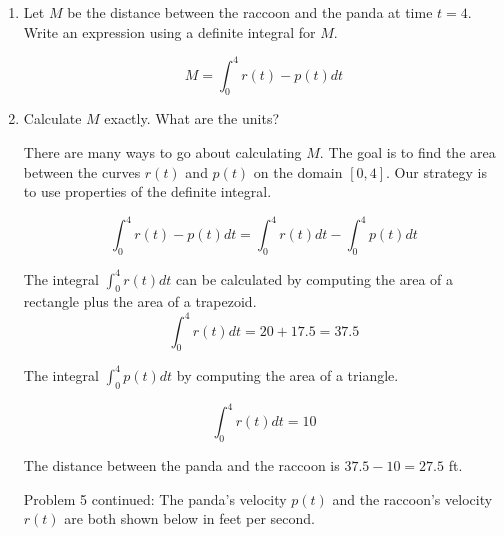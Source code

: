\documentclass{article}
\begin{document}
\begin{enumerate}
\begin{enumerate}
   

  \item  Let $M$ be the distance between the raccoon and the panda at
      time $t=4$.  Write an expression using a definite integral for $M$. 
      
      \probonly{\vfill}
   
\begin{solution}
  
     $$M = \int_{0}^4 r(t) - p(t)dt$$ 

  \end{solution}

  \item Calculate $M$ exactly. What are the units?%

\begin{solution} 
There are many ways to go about calculating $M$. The goal is to find the area between the curves $r(t)$ and $p(t)$ on the domain $[0,4]$. Our strategy is to use properties of the definite integral. 

$$\int_{0}^4 r(t) - p(t)dt = \int_{0}^4 r(t) dt- \int_{0}^4 p(t)dt$$


The integral $\int_{0}^4 r(t) dt$ can be calculated by computing the area of a rectangle plus the area of a trapezoid.  
$$ \int_{0}^4 r(t) dt = 20+17.5 = 37.5$$

The integral $\int_{0}^4 p(t) dt$ by computing the area of a triangle. 

$$\int_{0}^4 r(t) dt = 10$$

The distance between the panda and the raccoon is $37.5-10 = 27.5$ ft. 

\end{solution} 

\newpage

Problem 5 continued: The
  panda's velocity $p(t)$ and the raccoon's velocity $r(t)$ are both shown
  below in feet per second.   

  \begin{center}
  \end{center}
   

\end{enumerate}
\end{enumerate}
\end{document}
